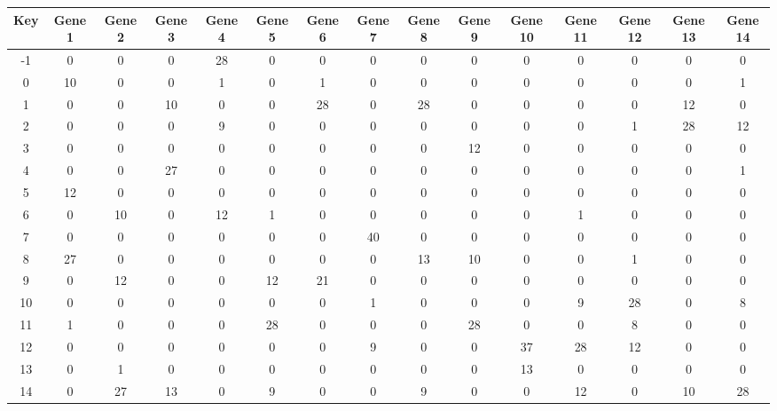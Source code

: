 \begin{tabular}{|c|c|c|c|c|c|c|c|c|c|c|c|c|c|c|}
\hline
Key & Gene 1 & Gene 2 & Gene 3 & Gene 4 & Gene 5 & Gene 6 & Gene 7 & Gene 8 & Gene 9 & Gene 10 & Gene 11 & Gene 12 & Gene 13 & Gene 14 \\
\hline
-1 & 0 & 0 & 0 & 28 & 0 & 0 & 0 & 0 & 0 & 0 & 0 & 0 & 0 & 0 \\
0 & 10 & 0 & 0 & 1 & 0 & 1 & 0 & 0 & 0 & 0 & 0 & 0 & 0 & 1 \\
1 & 0 & 0 & 10 & 0 & 0 & 28 & 0 & 28 & 0 & 0 & 0 & 0 & 12 & 0 \\
2 & 0 & 0 & 0 & 9 & 0 & 0 & 0 & 0 & 0 & 0 & 0 & 1 & 28 & 12 \\
3 & 0 & 0 & 0 & 0 & 0 & 0 & 0 & 0 & 12 & 0 & 0 & 0 & 0 & 0 \\
4 & 0 & 0 & 27 & 0 & 0 & 0 & 0 & 0 & 0 & 0 & 0 & 0 & 0 & 1 \\
5 & 12 & 0 & 0 & 0 & 0 & 0 & 0 & 0 & 0 & 0 & 0 & 0 & 0 & 0 \\
6 & 0 & 10 & 0 & 12 & 1 & 0 & 0 & 0 & 0 & 0 & 1 & 0 & 0 & 0 \\
7 & 0 & 0 & 0 & 0 & 0 & 0 & 40 & 0 & 0 & 0 & 0 & 0 & 0 & 0 \\
8 & 27 & 0 & 0 & 0 & 0 & 0 & 0 & 13 & 10 & 0 & 0 & 1 & 0 & 0 \\
9 & 0 & 12 & 0 & 0 & 12 & 21 & 0 & 0 & 0 & 0 & 0 & 0 & 0 & 0 \\
10 & 0 & 0 & 0 & 0 & 0 & 0 & 1 & 0 & 0 & 0 & 9 & 28 & 0 & 8 \\
11 & 1 & 0 & 0 & 0 & 28 & 0 & 0 & 0 & 28 & 0 & 0 & 8 & 0 & 0 \\
12 & 0 & 0 & 0 & 0 & 0 & 0 & 9 & 0 & 0 & 37 & 28 & 12 & 0 & 0 \\
13 & 0 & 1 & 0 & 0 & 0 & 0 & 0 & 0 & 0 & 13 & 0 & 0 & 0 & 0 \\
14 & 0 & 27 & 13 & 0 & 9 & 0 & 0 & 9 & 0 & 0 & 12 & 0 & 10 & 28 \\
\hline
\end{tabular}
